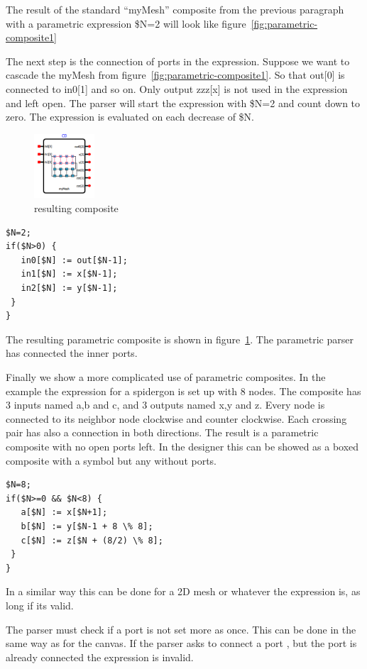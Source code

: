 The result of the standard ``myMesh'' composite from the previous paragraph with
a parametric expression \$N=2 will look like
figure~\ref{fig:parametric-composite1}

The next step is the connection of ports in the expression. Suppose we want to
cascade the myMesh from figure~\ref{fig:parametric-composite1}. So that out[0]
is connected to in0[1] and so on. Only output zzz[x] is not used in the
expression and left open. The parser will start the expression with \$N=2 and
count down to zero. The expression is evaluated on each decrease of \$N.

\begin{figure}
  \vspace{-20pt}
  \begin{center}
    \includegraphics[width=0.20\textwidth]{pictures/parametric-composite2}
  \caption{resulting composite}
  \label{fig:parametric-composite2}
  \end{center}
  \vspace{-30pt}
\end{figure}

\begin{lstlisting}
$N=2;
if($N>0) {
   in0[$N] := out[$N-1];
   in1[$N] := x[$N-1];
   in2[$N] := y[$N-1];
 }
}
\end{lstlisting}


The resulting parametric composite is shown in
figure~\ref{fig:parametric-composite2}. The parametric parser has connected the
inner ports.

Finally we show a more complicated use of parametric composites. In the example
the expression for a spidergon is set up with 8 nodes. The composite has 3
inputs named a,b and c, and 3 outputs named x,y and z. Every node is connected
to its neighbor node clockwise and counter clockwise. Each crossing pair has
also a connection in both directions. The result is a parametric composite with
no open ports left. In the designer this can be showed as a boxed composite with
a symbol but any without ports.

\begin{lstlisting}
$N=8;
if($N>=0 && $N<8) {
   a[$N] := x[$N+1]; 
   b[$N] := y[$N-1 + 8 \% 8];
   c[$N] := z[$N + (8/2) \% 8];
 }
}
\end{lstlisting}

In a similar way this can be done for a 2D mesh or whatever the expression is,
as long if its valid.

The parser must check if a port is not set more as once. This can be done in the
same way as for the canvas. If the parser asks to connect a port , but the port
is already connected the expression is invalid.



\newpage
